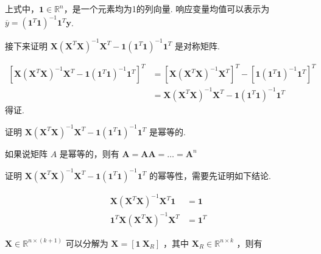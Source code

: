 \documentclass[UTF8]{ctexart}
\begin{document}
    上式中，$ \boldsymbol{1} \in \mathbb{R}^{n} $，是一个元素均为1的列向量. 响应变量均值可以表示为 $ \overline{y} = (\boldsymbol{1}^T \boldsymbol{1})^{-1} \boldsymbol{1}^T \boldsymbol{y} $.
    
    接下来证明 $ \boldsymbol{X} (\boldsymbol{X}^T \boldsymbol{X})^{-1} \boldsymbol{X}^T - \boldsymbol{1}  (\boldsymbol{1}^T \boldsymbol{1})^{-1} \boldsymbol{1}^T $ 是对称矩阵.
    
    \begin{equation}
    	\begin{aligned}
    		[\boldsymbol{X} (\boldsymbol{X}^T \boldsymbol{X})^{-1} \boldsymbol{X}^T - \boldsymbol{1}  (\boldsymbol{1}^T \boldsymbol{1})^{-1}  \boldsymbol{1}^T]^T 
    		&= [\boldsymbol{X} (\boldsymbol{X}^T \boldsymbol{X})^{-1} \boldsymbol{X}^T]^T - [\boldsymbol{1}  (\boldsymbol{1}^T \boldsymbol{1})^{-1}  \boldsymbol{1}^T]^T \\
    		&= \boldsymbol{X} (\boldsymbol{X}^T \boldsymbol{X})^{-1} \boldsymbol{X}^T - \boldsymbol{1}  (\boldsymbol{1}^T \boldsymbol{1})^{-1}  \boldsymbol{1}^T
    	\end{aligned}
    \end{equation}
    得证.
    
    证明 $ \boldsymbol{X} (\boldsymbol{X}^T \boldsymbol{X})^{-1} \boldsymbol{X}^T - \boldsymbol{1}  (\boldsymbol{1}^T \boldsymbol{1})^{-1} \boldsymbol{1}^T $ 是幂等的.
    
    如果说矩阵 $ A $ 是幂等的，则有 $ \boldsymbol{A} = \boldsymbol{A} \boldsymbol{A} = \dots = \boldsymbol{A}^n $
    
    证明 $ \boldsymbol{X} (\boldsymbol{X}^T \boldsymbol{X})^{-1} \boldsymbol{X}^T - \boldsymbol{1}  (\boldsymbol{1}^T \boldsymbol{1})^{-1} \boldsymbol{1}^T $ 的幂等性，需要先证明如下结论.
    
    
    \begin{equation}
        \begin{aligned}
            \boldsymbol{X} (\boldsymbol{X}^T \boldsymbol{X})^{-1} \boldsymbol{X}^T \boldsymbol{1} &= \boldsymbol{1} \\
            \boldsymbol{1}^T \boldsymbol{X} (\boldsymbol{X}^T \boldsymbol{X})^{-1} \boldsymbol{X}^T &= \boldsymbol{1}^T
        \end{aligned}
    \end{equation}

    $ \boldsymbol{X} \in \mathbb{R}^{n \times (k + 1)} $ 可以分解为 $ \boldsymbol{X} = [\boldsymbol{1} \  \boldsymbol{X}_R] $ ，其中 $ \boldsymbol{X}_{R} \in \mathbb{R}^{n \times k} $ ，则有 
   
\end{document}
